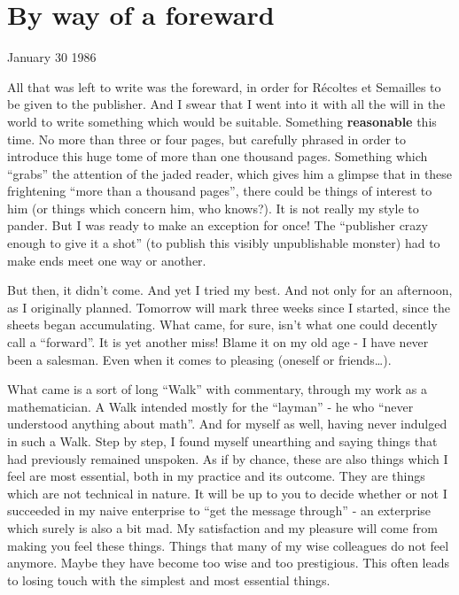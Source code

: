 \chapter{By way of a foreward}

January 30 1986

All that was left to write was the foreward, in order for
R\'ecoltes et Semailles to be given to the publisher.
And I swear that I went into it with all the will in the world to write something which
would be suitable. Something \textbf{reasonable} this time. No more than three or four pages,
but carefully phrased in order to introduce this huge tome of more than one thousand
pages. Something which ``grabs'' the attention of the jaded reader, 
which gives him a glimpse that in these frightening ``more than a thousand pages'', there
could be things of interest to him (or things which concern him, who knows?). It is not
really my style to pander. But I was ready to make an exception for once!
The ``publisher crazy enough to give it a shot'' (to publish this visibly unpublishable
monster) had to make ends meet one way or another. 

But then, it didn't come. And yet I tried my best. And not only for an afternoon, as I
originally planned. Tomorrow will mark three weeks since I started, since the sheets began
accumulating.
What came, for sure, isn't what one could decently call a ``forward''.
It is yet another miss! Blame it on my old age - I have never been a salesman. Even when
it comes to pleasing (oneself or friends\ldots).

What came is a sort of long ``Walk'' with commentary, through my work as a mathematician. 
A Walk intended mostly for the ``layman'' - he who ``never understood anything about
math''. And for myself as well, having never indulged in such a Walk. 
Step by step, I found myself unearthing and saying things that had previously remained
unspoken. As if by chance, these are also things which I feel are most essential, both in
my practice and its outcome. 
They are things which are not technical in nature. It will be up to you to decide whether
or not I succeeded in my naive enterprise to ``get the message through'' - an exterprise
which surely is also a bit mad. 
My satisfaction and my pleasure will come from making you feel these things. 
Things that many of my wise colleagues do not feel anymore. Maybe they have become too wise
and too prestigious.
This often leads to losing touch with the simplest and most essential things. 

